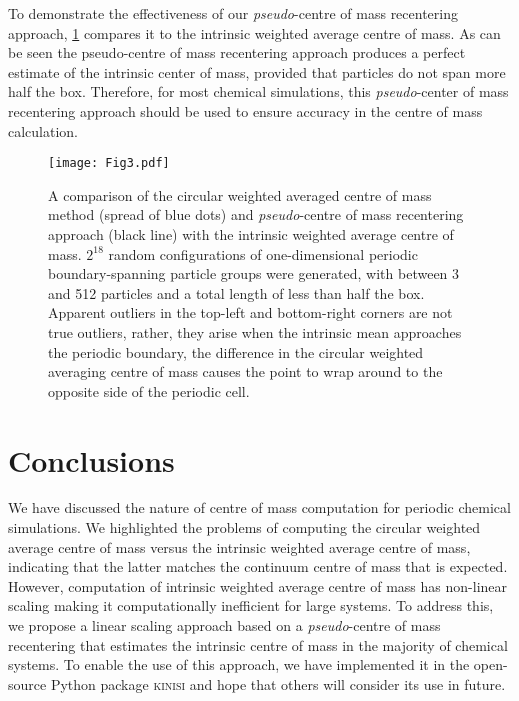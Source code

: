 \documentclass[reprint,superscriptaddress,nobibnotes,amsmath,amssymb,aip]{revtex4-2}
\begin{document}
To demonstrate the effectiveness of our \emph{pseudo}-centre of mass recentering approach, \cref{fig:method_valid} compares it to the intrinsic weighted average centre of mass. 
As can be seen the pseudo-centre of mass recentering approach produces a perfect estimate of the intrinsic center of mass, provided that particles do not span more half the box. 
Therefore, for most chemical simulations, this \emph{pseudo}-center of mass recentering approach should be used to ensure accuracy in the centre of mass calculation. 
%
\begin{figure}
    \centering
    \texttt{[image: Fig3.pdf]}
    \caption{A comparison of the circular weighted averaged centre of mass method (spread of blue dots) and \emph{pseudo}-centre of mass recentering approach (black line) with the intrinsic weighted average centre of mass. 
    $2^{18}$ random configurations of one-dimensional periodic boundary-spanning particle groups were generated, with between 3 and 512 particles and a total length of less than half the box. 
    Apparent outliers in the top-left and bottom-right corners are not true outliers, rather, they arise when the intrinsic mean approaches the periodic boundary, the difference in the circular weighted averaging centre of mass causes the point to wrap around to the opposite side of the periodic cell.
    }
    \label{fig:method_valid}
\end{figure}
%

\section{Conclusions}

We have discussed the nature of centre of mass computation for periodic chemical simulations.
We highlighted the problems of computing the circular weighted average centre of mass versus the intrinsic weighted average centre of mass, indicating that the latter matches the continuum centre of mass that is expected. 
However, computation of intrinsic weighted average centre of mass has non-linear scaling making it computationally inefficient for large systems. 
To address this, we propose a linear scaling approach based on a \emph{pseudo}-centre of mass recentering that estimates the intrinsic centre of mass in the majority of chemical systems. 
To enable the use of this approach, we have implemented it in the open-source Python package \textsc{kinisi}\cite{mccluskey_kinisi_2024} and hope that others will consider its use in future. 
\end{document}

